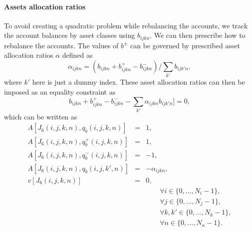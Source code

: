 \documentclass{report}[fleqn,12pt]
\begin{document}
\paragraph*{Assets allocation ratios}
To avoid creating a quadratic problem while rebalancing the accounts, we track the account balances
by asset classes using $b_{ijkn}$. We can then prescribe how to rebalance the accounts.
The values of $b^\pm$ can be governed by prescribed asset allocation ratios $\alpha$ defined as
\begin{equation}
	\label{Eq:Alloc1}
	\alpha_{ijkn} = (b_{ijkn} + b^+_{ijkn} - b^-_{ijkn})/\sum_{k'} b_{ijk'n},
\end{equation}
where $k'$ here is just a dummy index.
These asset allocation ratios can then be imposed as an equality constraint as
\begin{equation}
	\label{Eq:Alloc2}
	b_{ijkn} + b^+_{ijkn} - b^-_{ijkn} - \sum_{k'} \alpha_{ijkn} b_{ijk'n}] = 0,
\end{equation}
which can be written as
\begin{eqnarray}
	\label{Eq:Alloc3}
	A[J_6(i, j, k, n), q_b(i, j, k, n)] &=& 1, \nonumber\\
	A[J_6(i, j, k, n), q_b^+(i, j, k, n)] &=& 1, \nonumber\\
	A[J_6(i, j, k, n), q_b^-(i, j, k, n)] &=& -1, \nonumber\\
	A[J_6(i, j, k, n), q_b(i, j, k', n)] &=& - \alpha_{ijkn}, \nonumber\\
	v[J_6(i, j, k, n)] &=& 0, \\
	&&\qquad\forall i \in \{0,\ldots, N_i-1\},\nonumber\\
	&&\qquad\forall j \in \{0,\ldots, N_j-1\},\nonumber\\
	&&\qquad\forall k,k' \in \{0,\ldots, N_k-1\},\nonumber\\
	&&\qquad\forall n \in \{0,\ldots, N_n-1\}. \nonumber
\end{eqnarray}
\end{document}
